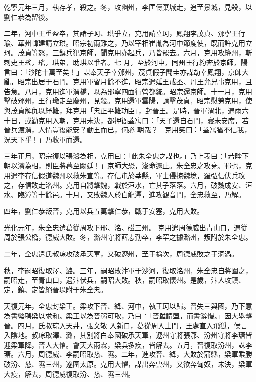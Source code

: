 \begin{pinyinscope}
 乾寧元年三月，執存孝，殺之。冬，攻幽州，李匡儔棄城走，追至景城，見殺，以劉仁恭為留後。



 二年，河中王重盈卒，其諸子珂、珙爭立，克用請立珂，鳳翔李茂貞、邠寧王行瑜、華州韓建請立珙。昭宗初兩難之，乃以宰相崔胤為河中節度使，既而許克用立珂。茂貞等怒，三鎮兵犯京師，聞克用亦起兵，乃皆罷去。六月，克用攻絳州，斬刺史王瑤。瑤，珙弟，助珙以爭者。七
 月，至於河中，同州王行約奔於京師，陽言曰：「沙陀十萬至矣！」謀奉天子幸邠州，茂貞假子閻圭亦謀劫幸鳳翔，京師大亂，昭宗出居于石門。克用軍留月餘不進，昭宗遣延王戒丕、丹王允兄事克用，且告急。八月，克用進軍渭橋，以為邠寧四面行營都統。昭宗還京師。十一月，克用擊破邠州，王行瑜走至慶州，見殺。克用還軍雲陽，請擊茂貞，昭宗慰勞克用，使與茂貞解仇以紓難，拜克用「忠正平難功臣」，封晉王。是時，晉軍渭北，遇雨六十日，或勸克用入朝，克用未決，都押衙蓋寓曰：「天子還自石門，寢未安席，若晉兵渡渭，人情豈復能安？勤王而已，何必
 朝哉？」克用笑曰：「蓋寓猶不信我，況天下乎！」乃收軍而還。



 三年正月，昭宗復以張濬為相，克用曰：「此朱全忠之謀也。」乃上表曰：「若陛下朝以濬為相，則臣將暮至闕廷！」京師大恐，浚命遽止。朱全忠之攻兗、鄆也，克用遣李存信假道魏州以救朱宣等。存信屯於莘縣，軍士侵掠魏境，羅弘信伏兵攻之，存信敗走洺州。克用自將擊魏，戰於洹水，亡其子落落。六月，破魏成安、洹水、臨漳等十餘邑。十月，又敗魏人於白龍潭，進攻觀音門，全忠救至，乃解。



 四年，劉仁恭叛晉，克用以兵五萬擊仁恭，戰于安塞，克用大敗。



 光化元年，朱全忠遣葛從周攻下邢、洺、磁三州。
 克用遣周德威出青山口，遇從周於張公橋，德威大敗。冬，潞州守將薛志勤卒，李罕之據潞州，叛附於朱全忠。



 二年，全忠遣氏叔琮攻破承天軍，又破遼州，至于榆次，周德威敗之于洞渦。



 秋，李嗣昭復取澤、潞。三年，嗣昭敗汴軍于沙河，復取洺州，朱全忠自將圍之，嗣昭走，至青山口，遇汴伏兵，嗣昭大敗。秋，嗣昭取懷州。是歲，汴人攻鎮、定，鎮、定皆絕晉以附于朱全忠。



 天復元年，全忠封梁王。梁攻下晉、絳、河中，執王珂以歸。晉失三與國，乃下意為書幣聘梁以求和。梁王以為晉弱可取，乃曰：「晉雖請盟，而書辭慢。」因大舉擊晉。四月，氏叔琮入天井，張文敬
 入新口，葛從周入土門，王處直入飛狐，侯言入陰地。叔琮取澤、潞，其別將白奉國破承天軍，遼州守將張鄂、汾州守將李瑭皆迎梁軍降，晉人大懼。會天大雨霖，梁兵多疾，皆解去。五月，晉復取汾州，誅李瑭。六月，周德威、李嗣昭取慈、隰。二年，進攻晉、絳，大敗於蒲縣，梁軍乘勝破汾、慈、隰三州，遂圍太原。克用大懼，謀出奔雲州，又欲奔匈奴，未決，梁軍大疫，解去，周德威復取汾、慈、隰三州。




\end{pinyinscope}
